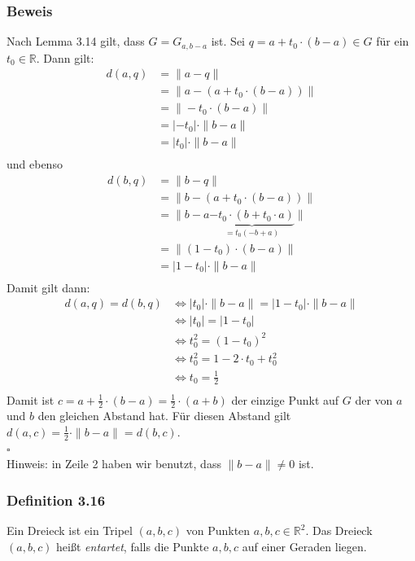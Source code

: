 \documentclass{article}
\begin{document}
\subsubsection*{Beweis}
Nach Lemma 3.14 gilt, dass $G = G_{a,b-a}$ ist. Sei $q = a+t_0 \cdot (b-a) \in G$ für ein $t_0 \in \mathbb{R}$.
Dann gilt: \\
\begin{align*}
    d(a,q) &= \|a-q\| \\
    &= \|a-(a+t_0 \cdot (b-a))\| \\
    &= \|-t_0 \cdot (b-a)\| \\
    &= |-t_0| \cdot \|b-a\| \\
    &= |t_0| \cdot \|b-a\| \\
\end{align*}
und ebenso \\
\begin{align*}
    d(b,q) &= \|b-q\| \\
    &= \|b-(a+t_0 \cdot (b-a))\| \\
    &= \|b-a\underbrace{-t_0 \cdot (b+t_0 \cdot a)}_{=t_0(-b+a)}\| \\
    &= \|(1-t_0) \cdot (b-a)\| \\
    &= |1-t_0| \cdot \|b-a\| \\
\end{align*}
Damit gilt dann: \\
\begin{align*}
    d(a,q) = d(b,q) &\Leftrightarrow |t_0| \cdot \|b-a\| = |1-t_0| \cdot \|b-a\| \\
    &\Leftrightarrow |t_0| = |1-t_0| \\
    &\Leftrightarrow t_0^2 = (1-t_0)^2 \\
    &\Leftrightarrow t_0^2 = 1 - 2 \cdot t_0 + t_0^2 \\
    &\Leftrightarrow t_0 = \frac{1}{2} \\
\end{align*}
Damit ist $c = a + \frac{1}{2} \cdot (b-a) = \frac{1}{2} \cdot (a+b)$ der einzige Punkt auf $G$ der von $a$ und $b$ den gleichen Abstand hat. 
Für diesen Abstand gilt $d(a,c) = \frac{1}{2} \cdot \|b-a\| = d(b,c)$. \\
$\square$ \\
Hinweis: in Zeile 2 haben wir benutzt, dass $\|b-a\| \neq 0$ ist. 

\subsubsection*{Definition 3.16}
Ein Dreieck ist ein Tripel $(a,b,c)$ von Punkten $a,b,c \in \mathbb{R}^2$. Das Dreieck $(a,b,c)$ heißt \textit{entartet}, falls die Punkte $a,b,c$ auf einer Geraden liegen. \\
\\
\end{document}
